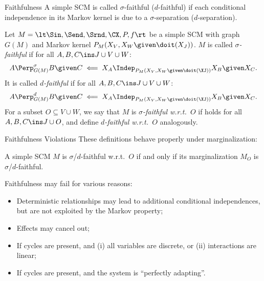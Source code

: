 \begin{frame}{Faithfulness}
A simple SCM is called $\sigma$-faithful ($d$-faithful) if each conditional independence in its Markov kernel
is due to a $\sigma$-separation ($d$-separation).
\begin{Def}[\ref{def:faithfulness}]
  Let $M = \lt \Sin, \Send, \Srnd, \CX, P, f \rt$ be a simple SCM with graph $G(M)$
  and Markov kernel $P_{M}(X_V,X_W \given \doit(X_J))$.
  $M$ is called \emph{$\sigma$-faithful} if 
  for all $A, B, C \ins J \cup V \cup W$:
  \begin{equation}\label{eq:sigma_faithful}
    A \Perp^\sigma_{G(M)} B \given C \impliedby X_A \Indep_{P_{M}(X_V,X_W \given \doit(\XJ))} X_B \given X_C.
  \end{equation}
  It is called \emph{$d$-faithful} if
  for all $A, B, C \ins J \cup V \cup W$:
  \begin{equation*}
    A \Perp^d_{G(M)} B \given C \impliedby X_A \Indep_{P_{M}(X_V,X_W \given \doit(\XJ))} X_B \given X_C.
  \end{equation*}
  For a subset $O \subseteq V \cup W$, we say that $M$ is \emph{$\sigma$-faithful w.r.t.\ $O$} if
   holds for all $A, B, C \ins J \cup O$, and define
  \emph{$d$-faithful w.r.t.\ $O$} analogously.
\end{Def}
\end{frame}

\begin{frame}{Faithfulness Violations}
These definitions behave properly under marginalization:
\begin{Rem}
A simple SCM $M$ is $\sigma$/$d$-faithful w.r.t.\ $O$ if and only if
its marginalization $M_O$ is $\sigma$/$d$-faithful.
\end{Rem}

\bigskip
Faithfulness may fail for various reasons:
\begin{itemize}
  \item Deterministic relationships may lead to additional conditional independences, but are not exploited by the Markov property;
  \item Effects may cancel out;
  \item If cycles are present, and (i) all variables are discrete, or (ii) interactions are linear;
  \item If cycles are present, and the system is ``perfectly adapting''.
\end{itemize}
\end{frame}

